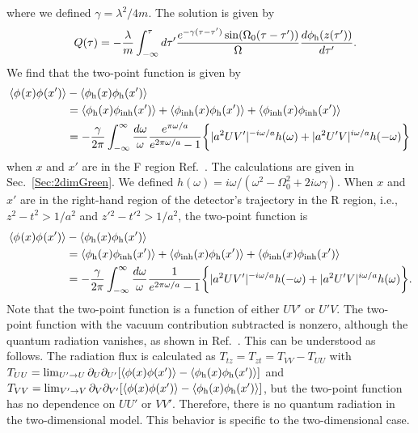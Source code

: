 \documentclass[aps,prd,preprintnumbers,nofootinbib,showpacs,11pt]{revtex4}%
\begin{document}
\begin{widetext}
where we defined $\gamma={\lambda^2/ 4m}$.
The solution is given by 
\begin{eqnarray}
&&Q(\tau)={-}{\lambda\over m}\int_{-\infty}^\tau d\tau' {e^{-\gamma(\tau-\tau')}\sin(\Omega_0(\tau-\tau'))\over \Omega}
{d\phi_{\rm h}(z(\tau'))\over d\tau'}. 
\end{eqnarray}
We find that the two-point function is given by 
\begin{align}
\langle\phi_{\rm }(x)\phi_{\rm }(x')\rangle&-\langle\phi_{\rm h}(x)\phi_{\rm h}(x')\rangle\nonumber\\
&=
\langle\phi_{\rm h}(x)\phi_{\rm inh}(x')\rangle
+\langle\phi_{\rm inh}(x)\phi_{\rm h}(x')\rangle
+\langle\phi_{\rm inh}(x)\phi_{\rm inh}(x')\rangle \nonumber\\
&=
-{\gamma\over 2\pi}\int_{-\infty}^{\infty}{d\omega\over \omega}{e^{\pi\omega/a}\over e^{2\pi\omega/a}-1}
\biggl\{|a^2 UV'|^{-i\omega/a}h(\omega)+|a^2 U'V|^{i\omega/a}h(-\omega)
\biggr\}
\label{tdfinal}
\end{align}
when $x$ and $x'$ are in the F region Ref.~\cite{HuRaval}. 
The calculations are given in Sec.~\ref{Sec:2dimGreen}.
We defined $h(\omega)=i\omega/(\omega^2-\Omega_0^2+2i\omega\gamma)$. 
When $x$ and $x'$ are in the right-hand region of the detector's trajectory in 
the R region, i.e., $z^2-t^2>1/a^2$ and $z'{}^2-t'{}^2>1/a^2$, the two-point function is
\begin{align}
\langle\phi_{\rm }(x)\phi_{\rm }(x')\rangle&-\langle\phi_{\rm h}(x)\phi_{\rm h}(x')\rangle\nonumber\\
& =
\langle\phi_{\rm h}(x)\phi_{\rm inh}(x')\rangle
+\langle\phi_{\rm inh}(x)\phi_{\rm h}(x')\rangle
+\langle\phi_{\rm inh}(x)\phi_{\rm inh}(x')\rangle
\nonumber\\
& =-{\gamma\over 2\pi}\int_{-\infty}^{\infty}{d\omega\over \omega}{1\over e^{2\pi\omega/a}-1}
\biggl\{|a^2 UV'|^{-i\omega/a}h(-\omega)+|a^2 U'V|^{i\omega/a}h(\omega)
\biggr\}.
\label{tdfinalR}
\end{align}
Note that the two-point function is a function of either $UV'$ or $U'V$.
The two-point function with the vacuum contribution subtracted is nonzero,
although
the quantum radiation vanishes, as shown in Ref.~\cite{HuRaval}.
This can be understood as follows. 
The radiation flux is calculated as
$T_{tz}=T_{zt}=T_{VV}-T_{UU}$ with $T_{UU}=\lim_{U'\rightarrow U} 
\partial_U\partial_{U'}
[\langle \phi(x)\phi(x')\rangle-\langle\phi_{\rm h}(x)\phi_{\rm h}(x')\rangle]$ 
and $T_{VV}=\lim_{V'\rightarrow V} 
\partial_V\partial_{V'}
[\langle \phi(x)\phi(x')\rangle-\langle\phi_{\rm h}(x)\phi_{\rm h}(x')\rangle]$,
but the two-point function has no dependence on $UU'$ or $VV'$. 
Therefore, there is no quantum radiation in the two-dimensional model.
This behavior is specific to the two-dimensional case. 


\end{widetext}
\end{document}
